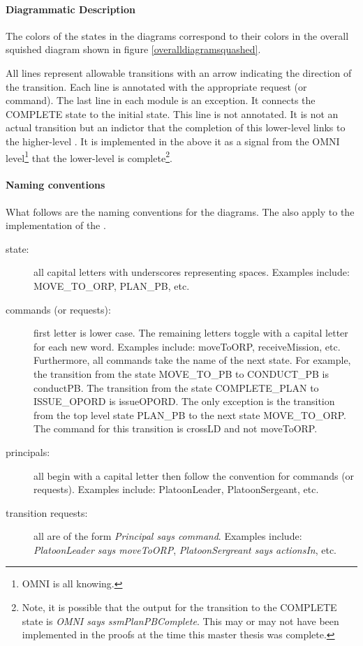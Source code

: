 \documentclass[../../main/main.tex]{subfiles}
\begin{document}
\paragraph*{Diagrammatic Description}
The colors of the states in the diagrams correspond to their colors in the overall squished diagram shown in figure \ref{overalldiagramsquashed}.  

All lines represent allowable transitions with an arrow indicating the direction of the transition.  Each line is annotated with the appropriate  request (or command).  The last line in each module is an exception.  It connects the COMPLETE state to the initial state.  This line is not annotated.  It is not an actual transition but an indictor that the completion of this lower-level  links to the higher-level .  It is implemented in the  above it as a signal from the OMNI level\footnote{OMNI is all knowing.} that the lower-level  is complete\footnote{Note, it is possible that the output for the transition to the COMPLETE state is \textit{OMNI says ssmPlanPBComplete}.  This may or may not have been implemented in the  proofs at the time this master thesis was complete.}. 

\paragraph*{Naming conventions}
What follows are the naming conventions for the diagrams.  The also apply to the  implementation of the .
\begin{description}
\item[state: ] all capital letters with underscores representing spaces.  Examples include: MOVE_TO_ORP, PLAN_PB, etc.
\item[commands (or requests):] first letter is lower case.  The remaining letters toggle with a capital letter for each new word.  Examples include: moveToORP,  receiveMission, etc.  Furthermore, all commands take the name of the next state. For example, the transition from the state MOVE_TO_PB to CONDUCT_PB is conductPB.  The transition from the state COMPLETE_PLAN to ISSUE_OPORD is issueOPORD.  The only exception is the transition from the top level state PLAN_PB to the next state MOVE_TO_ORP.  The command for this transition is crossLD and not moveToORP.
\item[principals:] all begin with a capital letter then follow the convention for commands (or requests).  Examples include: PlatoonLeader, PlatoonSergeant, etc.
\item [ transition requests:] all are of the form \textit{Principal says command}.  Examples include: \textit{PlatoonLeader says moveToORP}, \textit{PlatoonSergreant says actionsIn}, etc.
\end{description}
\end{document}
